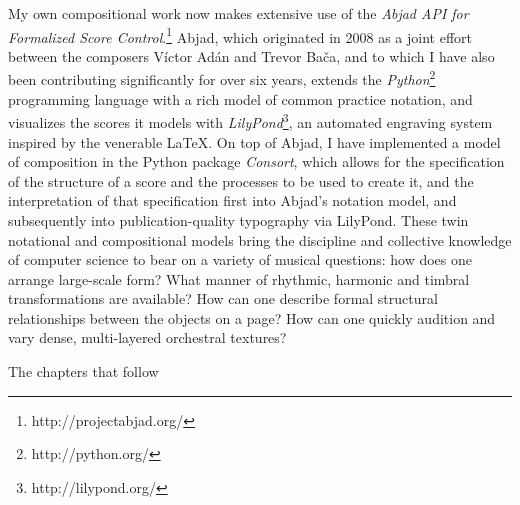 My own compositional work now makes extensive use of the \emph{Abjad API for
Formalized Score Control}.\cite{baca2011xi, baca2015tenor,
trevino2013compositional}\footnote{http://projectabjad.org/} Abjad, which
originated in 2008 as a joint effort between the composers V\'{i}ctor Ad\'{a}n
and Trevor Ba\v{c}a, and to which I have also been contributing significantly
for over six years, extends the
\emph{Python}\cite{vanrossum2003ys}\footnote{http://python.org/}
programming language with a rich model of common practice notation, and
visualizes the scores it models with
\emph{LilyPond}\cite{nienhuys2003ve}\footnote{http://lilypond.org/}, an
automated engraving system inspired by the venerable \LaTeX{}. On top of Abjad,
I have implemented a model of composition in the Python package \emph{Consort},
which allows for the specification of the structure of a score and the
processes to be used to create it, and the interpretation of that specification
first into Abjad's notation model, and subsequently into publication-quality
typography via LilyPond. These twin notational and compositional models bring
the discipline and collective knowledge of computer science to bear on a
variety of musical questions: how does one arrange large-scale form? What
manner of rhythmic, harmonic and timbral transformations are available? How can
one describe formal structural relationships between the objects on a page? How
can one quickly audition and vary dense, multi-layered orchestral textures?

The chapters that follow


